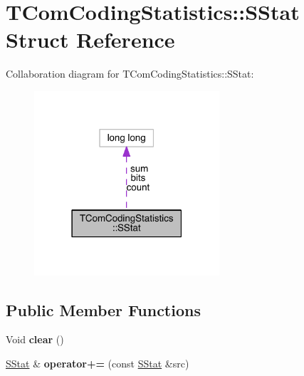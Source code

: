 \hypertarget{struct_t_com_coding_statistics_1_1_s_stat}{}\section{T\+Com\+Coding\+Statistics\+:\+:S\+Stat Struct Reference}
\label{struct_t_com_coding_statistics_1_1_s_stat}


Collaboration diagram for T\+Com\+Coding\+Statistics\+:\+:S\+Stat\+:
\nopagebreak
\begin{figure}[H]
\begin{center}
\leavevmode
\includegraphics[width=195pt]{dd/d6f/struct_t_com_coding_statistics_1_1_s_stat__coll__graph}
\end{center}
\end{figure}
\subsection*{Public Member Functions}
\begin{DoxyCompactItemize}
\item 
\mbox{\label{struct_t_com_coding_statistics_1_1_s_stat_a0cb465e8382274dae2fc7f639896befa}} 
Void {\bfseries clear} ()
\item 
\mbox{\label{struct_t_com_coding_statistics_1_1_s_stat_afe1848f31e9a35267a22dcb5e628e494}} 
\hyperlink{struct_t_com_coding_statistics_1_1_s_stat}{S\+Stat} \& {\bfseries operator+=} (const \hyperlink{struct_t_com_coding_statistics_1_1_s_stat}{S\+Stat} \&src)
\end{DoxyCompactItemize}
